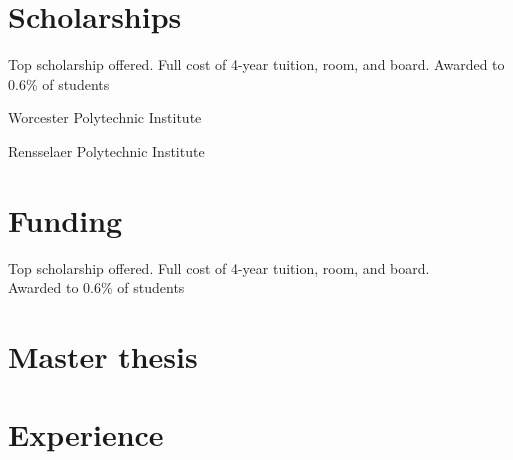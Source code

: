 \documentclass[11pt,letterpaper]{moderncv}
\begin{document}
\section{Scholarships}
{	
\begin{adjustwidth}{.25in}{}
	Top scholarship offered. Full cost of 4-year tuition, room, and board. \newline
	Awarded to 0.6\% of students
\end{adjustwidth}
}

 {}{Worcester Polytechnic Institute}{}

 {}{Rensselaer Polytechnic Institute}{}

\section{Funding}
{	
	\begin{adjustwidth}{.25in}{}
		Top scholarship offered. Full cost of 4-year tuition, room, and board. \\
		Awarded to 0.6\% of students
	\end{adjustwidth}
}

\section{Master thesis}

\section{Experience}
\end{document}

